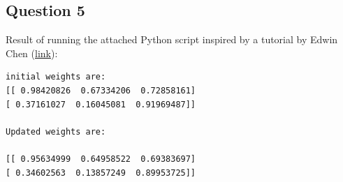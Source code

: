 \documentclass[paper=a4, fontsize=11pt]{scrartcl} %
\begin{document}
    \newpage
    \subsection*{Question 5}
    Result of running the attached Python script inspired by a tutorial by Edwin Chen (\href{http://blog.echen.me/2011/07/18/introduction-to-restricted-boltzmann-machines/}{link}):

    \begin{lstlisting}
initial weights are:
[[ 0.98420826  0.67334206  0.72858161]
[ 0.37161027  0.16045081  0.91969487]] 

Updated weights are:

[[ 0.95634999  0.64958522  0.69383697]
[ 0.34602563  0.13857249  0.89953725]]
    \end{lstlisting}


    \printbibliography
\end{document}
